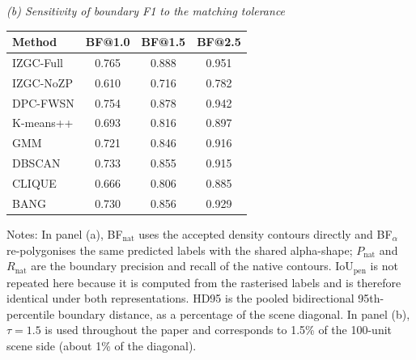 \begin{table}[tbp]
\vspace{6pt}
\noindent\textit{(b) Sensitivity of boundary F1 to the matching tolerance}
\par\vspace{2pt}
\begin{tabular*}{0.66\textwidth}{@{\extracolsep{\fill}}lccc@{}}
\toprule
Method & BF@1.0 & BF@1.5 & BF@2.5 \\
\midrule
IZGC-Full & 0.765 & 0.888 & 0.951 \\
IZGC-NoZP & 0.610 & 0.716 & 0.782 \\
DPC-FWSN & 0.754 & 0.878 & 0.942 \\
K-means++ & 0.693 & 0.816 & 0.897 \\
GMM & 0.721 & 0.846 & 0.916 \\
DBSCAN & 0.733 & 0.855 & 0.915 \\
CLIQUE & 0.666 & 0.806 & 0.885 \\
BANG & 0.730 & 0.856 & 0.929 \\
\bottomrule
\end{tabular*}

\vspace{2pt}
\noindent\footnotesize{Notes: In panel (a), BF$_{\mathrm{nat}}$ uses the accepted density contours directly and BF$_{\alpha}$ re-polygonises the same predicted labels with the shared alpha-shape; $P_{\mathrm{nat}}$ and $R_{\mathrm{nat}}$ are the boundary precision and recall of the native contours. $\mathrm{IoU}_{\mathrm{pen}}$ is not repeated here because it is computed from the rasterised labels and is therefore identical under both representations. HD95 is the pooled bidirectional 95th-percentile boundary distance, as a percentage of the scene diagonal. In panel (b), $\tau=1.5$ is used throughout the paper and corresponds to 1.5\% of the 100-unit scene side (about 1\% of the diagonal).}
\end{table}

